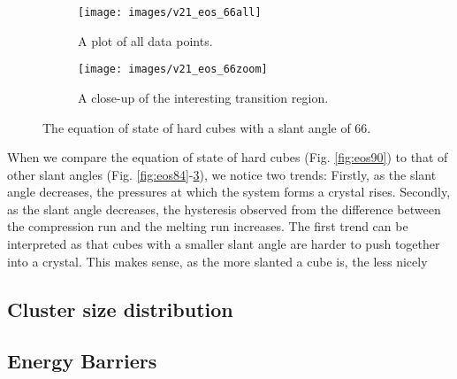 \documentclass[thesis]{subfiles}
\begin{document}
\begin{figure}[h]
	\begin{subfigure}[t]{0.475\textwidth}
		\texttt{[image: images/v21\_eos\_66all]}
		\caption{A plot of all data points.}
		\label{fig:eos66-a}
	\end{subfigure}\hfill
	\begin{subfigure}[t]{0.475\textwidth}
		\texttt{[image: images/v21\_eos\_66zoom]}
		\caption{A close-up of the interesting transition region.}
		\label{fig:eos66-b}
	\end{subfigure}
	\caption{The equation of state of hard cubes with a slant angle of 66\degr.}
	\label{fig:eos66}
\end{figure}

When we compare the equation of state of hard cubes (Fig. \ref{fig:eos90}) to that of other slant angles (Fig. \ref{fig:eos84}-\ref{fig:eos66}), we notice two trends: Firstly, as the slant angle decreases, the pressures at which the system forms a crystal rises. Secondly, as the slant angle decreases, the hysteresis observed from the difference between the compression run and the melting run increases.
The first trend can be interpreted as that cubes with a smaller slant angle are harder to push together into a crystal. This makes sense, as the more slanted a cube is, the less nicely 

\subsection{Cluster size distribution}\label{subsec:clsz distr}

\subsection{Energy Barriers}\label{subsec:E bar}
\end{document}
